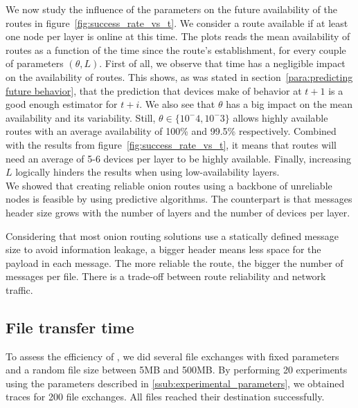 We now study the influence of the parameters on the future availability of the routes in figure~\ref{fig:success_rate_vs_t}.
We consider a route available if at least one node per layer is online at this time.
The plots reads the mean availability of routes as a function of the time since the route's establishment, for every couple of parameters $(\theta, L)$.
First of all, we observe that time has a negligible impact on the availability of routes. 
This shows, as was stated in section~\ref{para:predicting future behavior}, that the prediction that devices make of behavior at $t+1$ is a good enough estimator for $t+i$.
We also see that $\theta$ has a big impact on the mean availability and its variability.
Still, $\theta\in\{10^-4, 10^-3\}$ allows highly available routes with an average availability of 100\% and 99.5\% respectively.
Combined with the results from figure~\ref{fig:success_rate_vs_t}, it means that routes will need an average of 5-6 devices per layer to be highly available.
Finally, increasing $L$ logically hinders the results when using low-availability layers.
\\

We showed that creating reliable onion routes using a backbone of unreliable nodes is feasible by using predictive algorithms.
The counterpart is that messages header size grows with the number of layers and the number of devices per layer.

Considering that most onion routing solutions use a statically defined message size to avoid information leakage, a bigger header means less space for the payload in each message. The more reliable the route, the bigger the number of messages per file. There is a trade-off between route reliability and network traffic.

\subsection{File transfer time} %
\label{sub:file_transfer}


To assess the efficiency of \name, we did several file exchanges with fixed parameters and a random file size between 5MB and 500MB.
By performing 20 experiments using the parameters described in \ref{ssub:experimental_parameters}, we obtained traces for 200 file exchanges.
All files reached their destination successfully.

